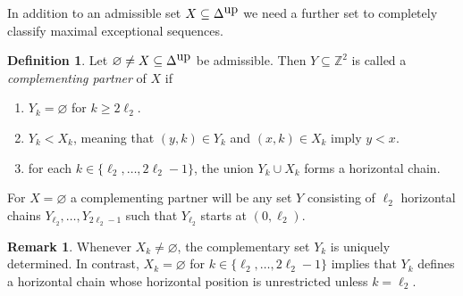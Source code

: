 \documentclass[11pt]{article}
\theoremstyle{definition}
\newtheorem{defi}[theo]{Definition}
\newtheorem{rema}[theo]{Remark}
\numberwithin{equation}{section}
\newcommand{\Z}{\mathbb Z}
\newcommand{\DeltaUp}{\Delta^{\mbox{\tiny up}}}
\newcommand{\mes}{maximal exceptional sequence}
\begin{document}
In addition to an admissible set
$X\subseteq \DeltaUp$ we need 
a further set to completely 
classify {\mes}s.

\begin{defi}
\label{def:SuppPartnerPC}
Let $\varnothing\not=X\subseteq\DeltaUp$ 
be admissible. Then $Y\subseteq\Z^2$ 
is called a {\em complementing partner} 
of $X$ if
\begin{enumerate}
\item[(Cv)]
$Y_k=\varnothing$ for $k\geq 2\ell_2$.
\vspace{1ex}
\item[(Cvi)]
$Y_k<X_k$, meaning that $(y,k)\in Y_k$ 
and $(x,k)\in X_k$ imply $y<x$.
\vspace{1ex}
\item[(Cvii)]
for each $k\in\{\ell_2,\ldots,2\ell_2-1\}$, 
the union $Y_k\cup X_k$ forms a horizontal 
chain.
\end{enumerate}

For $X=\varnothing$ a complementing partner 
will be any set $Y$ consisting of $\ell_2$ 
horizontal chains $Y_{\ell_2},\ldots,
Y_{2\ell_2-1}$ such that $Y_{\ell_2}$ 
starts at $(0,\ell_2)$.
\end{defi}

\begin{rema}
Whenever $X_k\neq\varnothing$, the 
complementary set $Y_k$ is uniquely 
determined. In contrast, $X_k=\varnothing$ 
for $k\in\{\ell_2,\ldots,2\ell_2-1\}$ 
implies that $Y_k$ defines a horizontal 
chain whose horizontal position is 
unrestricted unless $k=\ell_2$.
\end{rema}
\end{document}
